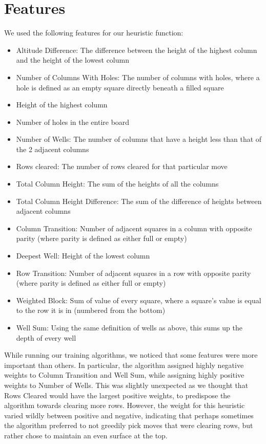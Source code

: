 \documentclass{article}
\begin{document}
\section{Features}
We used the following features for our heuristic function:
\begin{itemize}
	\item Altitude Difference: The difference between the height of the highest column and the height of the lowest column
	\item Number of Columns With Holes: The number of columns with holes, where a hole is defined as an empty square directly beneath a filled square
	\item Height of the highest column
	\item Number of holes in the entire board
	\item Number of Wells: The number of columns that have a height less than that of the 2 adjacent columns
	\item Rows cleared: The number of rows cleared for that particular move
	\item Total Column Height: The sum of the heights of all the columns
	\item Total Column Height Difference: The sum of the difference of heights between adjacent columns
	\item Column Transition: Number of adjacent squares in a column with opposite parity (where parity is defined as either full or empty)
	\item Deepest Well: Height of the lowest column
	\item Row Transition: Number of adjacent squares in a row with opposite parity (where parity is defined as either full or empty)
	\item Weighted Block: Sum of value of every square, where a square's value is equal to the row it is in (numbered from the bottom)
	\item Well Sum: Using the same definition of wells as above, this sums up the depth of every well
\end{itemize}

While running our training algorithms, we noticed that some features were more
important than others. In particular, the algorithm assigned highly negative
weights to Column Transition and Well Sum, while assigning highly positive
weights to Number of Wells. This was slightly unexpected as we thought that
Rows Cleared would have the largest positive weights, to predispose the
algorithm towards clearing more rows. However, the weight for this heuristic
varied wildly between positive and negative, indicating that perhaps sometimes
the algorithm preferred to not greedily pick moves that were clearing rows, but
rather chose to maintain an even surface at the top.
\end{document}
